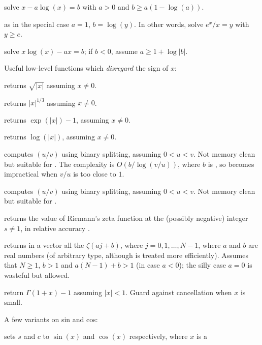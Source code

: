 solve $x - a  \log(x) = b$ with $a > 0$ and $b \geq a (1 - \log(a))$.

 as 
in the special case $a = 1$, $b = \log(y)$. In other words,
solve $e^x / x = y$ with $y \geq e$.

solve $x  \log(x) - a  x = b$; if $b < 0$, assume $a \geq 1 + \log |b|$.

\noindent Useful low-level functions which \emph{disregard} the sign of $x$:

 returns $\sqrt{|x|}$ assuming $x\neq 0$.

 returns $|x|^{1/3}$ assuming $x\neq 0$.

 returns $\exp(|x|) - 1$, assuming $x \neq 0$.

 returns $\log(|x|)$, assuming $x \neq 0$.


 computes $(u/v)$
using binary splitting, assuming $0 < u < v$. Not memory clean but suitable
for . The complexity is $O(b / \log(v/u))$, where $b$ is
, so becomes impractical when $v/u$ is too close to
$1$.

 computes $(u/v)$
using binary splitting, assuming $0 < u < v$. Not memory clean but suitable
for .

 returns the value of Riemann's zeta
function at the (possibly negative) integer $s\neq 1$, in relative accuracy
.

 returns in a vector
all the $\zeta(aj + b)$, where $j = 0, 1, \dots, N-1$, where $a$ and
$b$ are real numbers (of arbitrary type, although  is treated
more efficiently). Assumes that $N \geq 1$, $b > 1$ and $a(N-1) + b > 1$
(in case $a < 0$); the silly case $a = 0$ is wasteful but allowed.

 return $\Gamma(1+x) - 1$ assuming
$|x| < 1$. Guard against cancellation when $x$ is small.

\noindent A few variants on sin and cos:

 sets $s$ and $c$ to
$\sin(x)$ and $\cos(x)$ respectively, where $x$ is a 

